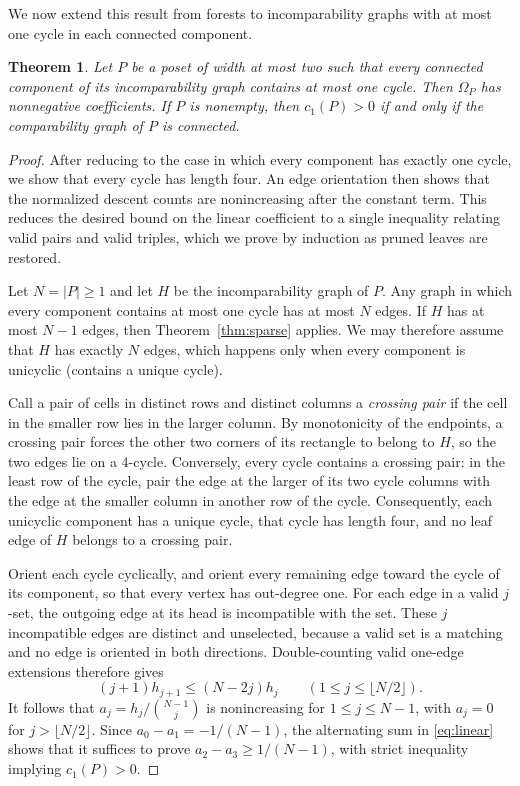 \documentclass[11pt]{amsart}
\newtheorem{theorem}{Theorem}[section]
\theoremstyle{remark}
\numberwithin{equation}{section}
\newcommand{\lin}{c_1}
\begin{document}
We now extend this result from forests to incomparability graphs with at most
one cycle in each connected component.

\begin{theorem}\label{thm:pseudoforest}
Let $P$ be a poset of width at most two such that every connected component of
its incomparability graph contains at most one cycle. Then $\Omega_P$ has
nonnegative coefficients. If $P$ is nonempty, then $\lin(P)>0$ if and only if
the comparability graph of $P$ is connected.
\end{theorem}

\begin{proof}
After reducing to the case in which every component has exactly one cycle, we
show that every cycle has length four. An edge orientation then shows that the
normalized descent counts are nonincreasing after the constant term. This
reduces the desired bound on the linear coefficient to a single inequality
relating valid pairs and valid triples, which we prove by induction as pruned
leaves are restored.

Let $N=|P|\ge1$ and let $H$ be the incomparability graph of $P$. Any graph in
which every component contains at most one cycle has at most $N$ edges. If $H$
has at most $N-1$ edges, then Theorem~\ref{thm:sparse} applies. We may
therefore assume that $H$ has exactly $N$ edges, which happens only when every
component is unicyclic (contains a unique cycle).

Call a pair of cells in distinct rows and distinct columns a
\emph{crossing pair} if the cell in the smaller row lies in the larger column.
By monotonicity of the endpoints, a crossing pair forces the other two corners
of its rectangle to belong to $H$, so the two edges lie on a $4$-cycle.
Conversely, every cycle contains a crossing pair: in the least row of the
cycle, pair the edge at the larger of its two cycle columns with the edge at
the smaller column in another row of the cycle. Consequently, each unicyclic
component has a unique cycle, that cycle has length four, and no leaf edge of
$H$ belongs to a crossing pair.

Orient each cycle cyclically, and orient every remaining edge toward the cycle
of its component, so that every vertex has out-degree one. For each edge in a
valid $j$-set, the outgoing edge at its head is incompatible with the set.
These $j$ incompatible edges are distinct and unselected, because a valid set
is a matching and no edge is oriented in both directions. Double-counting valid
one-edge extensions therefore gives
\[
 (j+1)h_{j+1}\le(N-2j)h_j\qquad(1\le j\le\lfloor N/2\rfloor).
\]
It follows that $a_j=h_j/\binom{N-1}{j}$ is nonincreasing for $1\le j\le N-1$,
with $a_j=0$ for $j>\lfloor N/2\rfloor$. Since $a_0-a_1=-1/(N-1)$, the
alternating sum in \eqref{eq:linear} shows that it suffices to prove
$a_2-a_3\ge1/(N-1)$, with strict inequality implying $\lin(P)>0$.


\end{proof}
\end{document}
